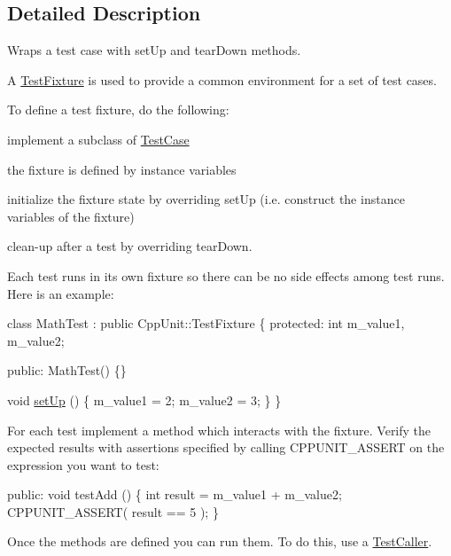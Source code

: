 \subsection{Detailed Description}
Wraps a test case with set\+Up and tear\+Down methods.

A \hyperlink{class_test_fixture}{Test\+Fixture} is used to provide a common environment for a set of test cases. 

To define a test fixture, do the following\+:
\begin{DoxyItemize}
\item implement a subclass of \hyperlink{class_test_case}{Test\+Case}
\item the fixture is defined by instance variables
\item initialize the fixture state by overriding set\+Up (i.\+e. construct the instance variables of the fixture)
\item clean-\/up after a test by overriding tear\+Down.
\end{DoxyItemize}

Each test runs in its own fixture so there can be no side effects among test runs. Here is an example\+:


\begin{DoxyCode}
\textcolor{keyword}{class }MathTest : \textcolor{keyword}{public} CppUnit::TestFixture \{
\textcolor{keyword}{protected}:
  \textcolor{keywordtype}{int} m\_value1, m\_value2;

\textcolor{keyword}{public}:
  MathTest() \{\}

  \textcolor{keywordtype}{void} \hyperlink{class_test_fixture_a0e77590b14a3ec7f93fe02e5b89a242f}{setUp} () \{
    m\_value1 = 2;
    m\_value2 = 3;
  \}
\}
\end{DoxyCode}


For each test implement a method which interacts with the fixture. Verify the expected results with assertions specified by calling C\+P\+P\+U\+N\+I\+T\+\_\+\+A\+S\+S\+E\+R\+T on the expression you want to test\+:


\begin{DoxyCode}
\textcolor{keyword}{public}: 
  \textcolor{keywordtype}{void} testAdd () \{
    \textcolor{keywordtype}{int} result = m\_value1 + m\_value2;
    CPPUNIT\_ASSERT( result == 5 );
  \}
\end{DoxyCode}


Once the methods are defined you can run them. To do this, use a \hyperlink{class_test_caller}{Test\+Caller}.


